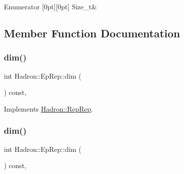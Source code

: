 \begin{DoxyEnumFields}{Enumerator}
[0pt][0pt]{}\mbox{\label{structHadron_1_1EpRep_a945027d359f892e9d281e86a25baa767aa251a0f4f8c253bf87c3c1d7104aa12a}} 
Size\+\_\+t&\\
\hline

\end{DoxyEnumFields}


\subsection{Member Function Documentation}
\mbox{\label{structHadron_1_1EpRep_a1c0d8b8924b0bb66325c1049fc6cd76e}} 
\subsubsection{\texorpdfstring{dim()}{dim()}\hspace{0.1cm}{\footnotesize\ttfamily [1/3]}}
{\footnotesize\ttfamily int Hadron\+::\+Ep\+Rep\+::dim (\begin{DoxyParamCaption}{ }\end{DoxyParamCaption}) const\hspace{0.3cm}{\ttfamily [inline]}, {\ttfamily [virtual]}}



Implements \mbox{\hyperlink{structHadron_1_1RepRep_a92c8802e5ed7afd7da43ccfd5b7cd92b}{Hadron\+::\+Rep\+Rep}}.

\mbox{\label{structHadron_1_1EpRep_a1c0d8b8924b0bb66325c1049fc6cd76e}} 
\subsubsection{\texorpdfstring{dim()}{dim()}\hspace{0.1cm}{\footnotesize\ttfamily [2/3]}}
{\footnotesize\ttfamily int Hadron\+::\+Ep\+Rep\+::dim (\begin{DoxyParamCaption}{ }\end{DoxyParamCaption}) const\hspace{0.3cm}{\ttfamily [inline]}, {\ttfamily [virtual]}}



